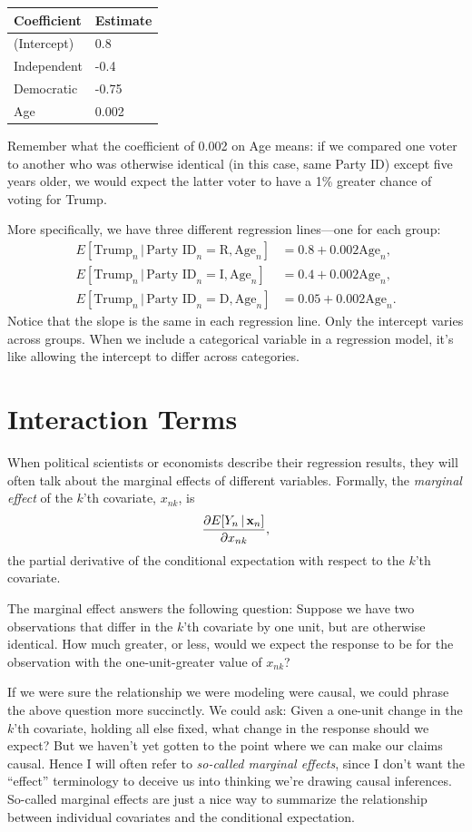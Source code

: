 \documentclass[12pt,oneside,openany]{book}
\begin{document}
\begin{longtable}[c]{@{}ll@{}}
\toprule
Coefficient & Estimate\tabularnewline
\midrule
\endhead
(Intercept) & 0.8\tabularnewline
Independent & -0.4\tabularnewline
Democratic & -0.75\tabularnewline
Age & 0.002\tabularnewline
\bottomrule
\end{longtable}

Remember what the coefficient of 0.002 on Age means: if we compared one
voter to another who was otherwise identical (in this case, same Party
ID) except five years older, we would expect the latter voter to have a
1\% greater chance of voting for Trump.

More specifically, we have three different regression lines---one for
each group: \[
\begin{aligned}
  E[\text{Trump}_n \,|\, \text{Party ID}_n = \text{R}, \text{Age}_n] &= 0.8 + 0.002 \text{Age}_n, \\
  E[\text{Trump}_n \,|\, \text{Party ID}_n = \text{I}, \text{Age}_n] &= 0.4 + 0.002 \text{Age}_n, \\
  E[\text{Trump}_n \,|\, \text{Party ID}_n = \text{D}, \text{Age}_n] &= 0.05 + 0.002 \text{Age}_n.
\end{aligned}
\] Notice that the slope is the same in each regression line. Only the
intercept varies across groups. When we include a categorical variable
in a regression model, it's like allowing the intercept to differ across
categories.

\section{Interaction Terms}\label{interaction-terms}

When political scientists or economists describe their regression
results, they will often talk about the marginal effects of different
variables. Formally, the \emph{marginal effect} of the \(k\)'th
covariate, \(x_{nk}\), is \[
\frac{\partial E[Y_n \,|\, \mathbf{x}_n]}{\partial x_{nk}},
\] the partial derivative of the conditional expectation with respect to
the \(k\)'th covariate.

The marginal effect answers the following question: Suppose we have two
observations that differ in the \(k\)'th covariate by one unit, but are
otherwise identical. How much greater, or less, would we expect the
response to be for the observation with the one-unit-greater value of
\(x_{nk}\)?

If we were sure the relationship we were modeling were causal, we could
phrase the above question more succinctly. We could ask: Given a
one-unit change in the \(k\)'th covariate, holding all else fixed, what
change in the response should we expect? But we haven't yet gotten to
the point where we can make our claims causal. Hence I will often refer
to \emph{so-called marginal effects}, since I don't want the ``effect''
terminology to deceive us into thinking we're drawing causal inferences.
So-called marginal effects are just a nice way to summarize the
relationship between individual covariates and the conditional
expectation.
\end{document}
